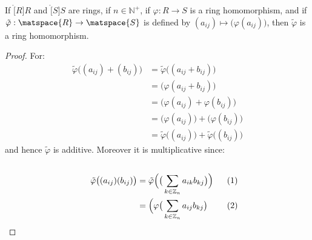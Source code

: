 \documentclass{article}                                                        %
\begin{document}
                \begin{theorem}
                    If $\ring[R]{R}$ and $\ring[S]{S}$ are rings, if
                    $n\in\mathbb{N}^{+}$, if $\varphi:R\rightarrow{S}$ is a
                    ring homomorphism, and if
                    $\tilde{\varphi}:\matspace{R}\rightarrow\matspace{S}$ is
                    defined by $(a_{ij})\mapsto\big(\varphi(a_{ij})\big)$,
                    then $\tilde{\varphi}$ is a ring homomorphism.
                \end{theorem}
                \begin{proof}
                    For:
                    \begin{subequations}
                        \begin{align}
                            \tilde{\varphi}\big((a_{ij})+(b_{ij})\big)
                            &=\tilde{\varphi}\big((a_{ij}+b_{ij})\big)\\
                            &=\big(\varphi(a_{ij}+b_{ij})\big)\\
                            &=\big(\varphi(a_{ij})+\varphi(b_{ij})\big)\\
                            &=\big(\varphi(a_{ij})\big)
                                +\big(\varphi(b_{ij})\big)\\
                            &=\tilde{\varphi}\big((a_{ij})\big)+
                                \tilde{\varphi}\big((b_{ij})\big)
                        \end{align}
                    \end{subequations}
                    and hence $\tilde{\varphi}$ is additive. Moreover it is
                    multiplicative since:
                    \par
                    \begin{subequations}
                        \begin{minipage}[t]{0.55\textwidth}
                            \centering
                            \begin{align}
                                \tilde{\varphi}\big((a_{ij})(b_{ij})\big)
                                &=\tilde{\varphi}\Big(
                                    \big(\sum_{k\in\mathbb{Z}_{n}}
                                        a_{ik}b_{kj}\big)
                                \Big)\\
                                &=\Big(\varphi\big(
                                    \sum_{k\in\mathbb{Z}_{n}}a_{ij}b_{kj}\big)

\end{align}
\end{minipage}
\end{subequations}
\end{proof}
\end{document}
